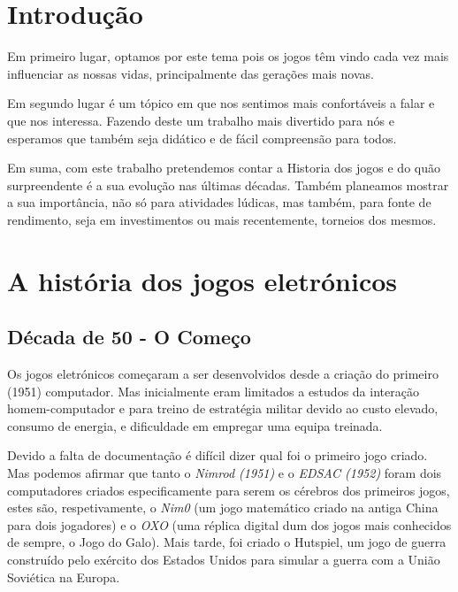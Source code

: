 \documentclass{report}
\begin{document}
\tableofcontents


\clearpage
{}

\chapter{Introdução}
\label{chap.introducao}
Em primeiro lugar, optamos por este tema pois os jogos têm vindo cada vez mais influenciar as nossas vidas, principalmente das gerações mais novas.

Em segundo lugar é um tópico em que nos sentimos mais confortáveis a falar e que nos interessa. Fazendo deste um trabalho mais divertido para nós e esperamos que também seja didático e de fácil compreensão para todos.

Em suma, com este trabalho pretendemos contar a Historia dos jogos e do quão surpreendente é a sua evolução nas últimas décadas. Também planeamos mostrar a sua importância, não só para atividades lúdicas, mas também, para fonte de rendimento, seja em investimentos ou mais recentemente, torneios dos mesmos.

\chapter{A história dos jogos eletrónicos}
\label{chap.A história dos jogos eletrónicos}


\section{Década de 50 - O Começo}
\label{sec.Década de 50 - O Começo}
Os jogos eletrónicos começaram a ser desenvolvidos desde a criação do primeiro (1951) computador. Mas inicialmente eram limitados a estudos da interação homem-computador e para treino de estratégia militar devido ao custo elevado, consumo de energia, e dificuldade em empregar uma equipa treinada.

Devido a falta de documentação é difícil dizer qual foi o primeiro jogo criado. Mas podemos afirmar que tanto o \textit{Nimrod (1951)} e o \textit{EDSAC (1952)} foram dois computadores criados especificamente para serem os cérebros dos primeiros jogos, estes são, respetivamente, o \textit{Nim0} (um jogo matemático criado na antiga China para dois jogadores) e o \textit{OXO} (uma réplica digital dum dos jogos mais conhecidos de sempre, o Jogo do Galo). Mais tarde, foi criado o Hutspiel,  um jogo de guerra construído pelo exército dos Estados Unidos para simular a guerra com a União Soviética na Europa.
\end{document}

